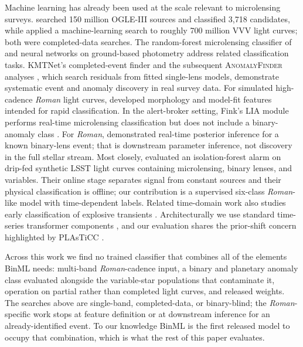 \documentclass[twocolumn,linenumbers,floatfix,twocolappendix]{aastex701}
\newcommand{\Rom}{\textit{Roman}}
\begin{document}
Machine learning has already been used at the scale relevant to microlensing surveys.
\citet{Wyrzykowski2015} searched 150 million OGLE-III sources and classified 3,718 candidates, while
\citet{Husseiniova2021} applied a machine-learning search to roughly 700 million VVV light curves;
both were completed-data searches. The random-forest microlensing classifier of \citet{Godines2019} and neural networks on
ground-based photometry \citep{Mroz2020} address related classification tasks. KMTNet's completed-event finder \citep{Kim2018EventFinder} and the subsequent
\textsc{AnomalyFinder} analyses \citep{Zang2022}, which search residuals from fitted single-lens
models, demonstrate systematic event and anomaly discovery in real survey data. For simulated high-cadence \Rom{} light curves,
\citet{Khakpash2021} developed morphology and model-fit features intended for rapid classification.
In the alert-broker setting, Fink's LIA module
performs real-time microlensing classification but does not include a binary-anomaly class
\citep{Moller2021}. For \Rom{}, \citet{Zhang2021} demonstrated real-time posterior inference for a
known binary-lens event; that is downstream parameter inference, not discovery in the full stellar
stream. Most closely, \citet{CrispimRomao2025} evaluated an isolation-forest alarm on drip-fed
synthetic LSST light curves containing microlensing, binary lenses, and variables. Their online
stage separates signal from constant sources and their physical classification is offline; our
contribution is a supervised six-class \Rom{}-like model with time-dependent labels. Related
time-domain work also studies early classification of explosive transients
\citep{Muthukrishna2019}. Architecturally we use standard time-series transformer components
\citep{Astromer2023,Vaswani2017}, and our evaluation shares the prior-shift concern highlighted by
PLAsTiCC \citep{Hlozek2020}.

Across this work we find no trained classifier that combines all of the elements BinML needs:
multi-band \Rom{}-cadence input, a binary and planetary anomaly class evaluated alongside the
variable-star populations that contaminate it, operation on partial rather than completed light
curves, and released weights. The searches above are single-band, completed-data, or
binary-blind; the \Rom{}-specific work stops at feature definition or at downstream inference
for an already-identified event. To our knowledge BinML is the first released model to occupy
that combination, which is what the rest of this paper evaluates.
\end{document}
